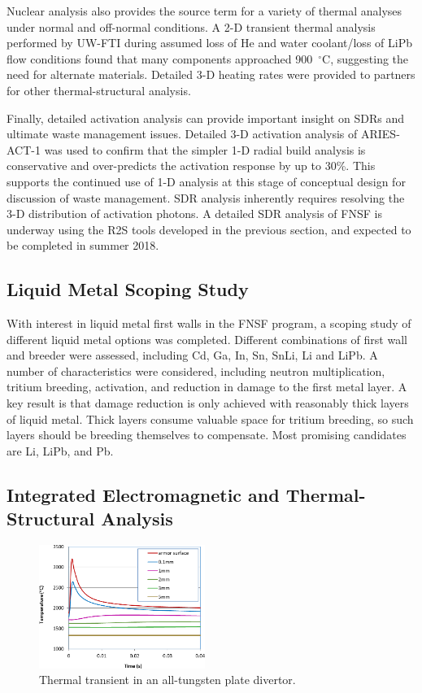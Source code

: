 Nuclear analysis also provides the source term for a variety of thermal
analyses under normal and off-normal conditions.  A 2-D transient thermal
analysis performed by \gls{UW-FTI} during assumed loss of He and water
coolant/loss of LiPb flow conditions found that many components approached
900\ $^\circ$C, suggesting the need for alternate materials.  Detailed 3-D
heating rates were provided to partners for other thermal-structural analysis.

Finally, detailed activation analysis can provide important insight on
\glspl{SDR} and ultimate waste management issues.  Detailed 3-D activation
analysis of ARIES-ACT-1 was used to confirm that the simpler 1-D radial build
analysis is conservative and over-predicts the activation response by up to
30\%. This supports the continued use of 1-D analysis at
this stage of conceptual design for discussion of waste management.  \gls{SDR}
analysis inherently requires resolving the 3-D distribution of activation
photons.  A detailed \gls{SDR} analysis of FNSF is underway using the
\gls{R2S} tools developed in the previous section, and expected to be
completed in summer 2018.

\subsection{Liquid Metal Scoping Study}

With interest in liquid metal first walls in the \gls{FNSF} program, a scoping
study of different liquid metal options was completed.  Different combinations
of first wall and breeder were assessed, including Cd, Ga, In, Sn, SnLi, Li
and LiPb.  A number of characteristics were considered, including neutron
multiplication, tritium breeding, activation, and reduction in damage to the
first metal layer.  A key result is that damage reduction is only achieved
with reasonably thick layers of liquid metal.  Thick layers consume valuable
space for tritium breeding, so such layers should be breeding themselves to
compensate.  Most promising candidates are Li, LiPb, and Pb.

\subsection{Integrated Electromagnetic and Thermal-Structural Analysis}

\begin{figure}
\centering
\includegraphics[width=0.48\textwidth]{imgs/elm-thermal.png}
\caption{\label{fig:elm-thermal}Thermal transient in an all-tungsten plate divertor.}
\end{figure}

